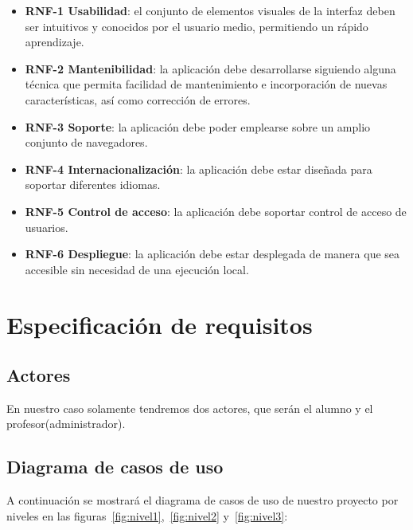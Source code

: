 \begin{itemize}
	\item \textbf{RNF-1 Usabilidad}: el conjunto de elementos visuales de la interfaz deben ser intuitivos y conocidos por el usuario medio, permitiendo un rápido aprendizaje.
	\item \textbf{RNF-2 Mantenibilidad}: la aplicación debe desarrollarse siguiendo alguna técnica que permita facilidad de mantenimiento e incorporación de nuevas características, así como corrección de errores.
	\item \textbf{RNF-3 Soporte}: la aplicación debe poder emplearse sobre un amplio conjunto de navegadores.
	\item \textbf{RNF-4 Internacionalización}: la aplicación debe estar diseñada para soportar diferentes idiomas.
	\item \textbf{RNF-5 Control de acceso}: la aplicación debe soportar control de acceso de usuarios.
	\item \textbf{RNF-6 Despliegue}: la aplicación debe estar desplegada de manera que sea accesible sin necesidad de una ejecución local.
\end{itemize}

\section{Especificación de requisitos}

\subsection{Actores}
En nuestro caso solamente tendremos dos actores, que serán el alumno y el profesor(administrador).

\subsection{Diagrama de casos de uso}
A continuación se mostrará el diagrama de casos de uso de nuestro proyecto por niveles en las figuras~\ref{fig:nivel1},~\ref{fig:nivel2} y~\ref{fig:nivel3}:



